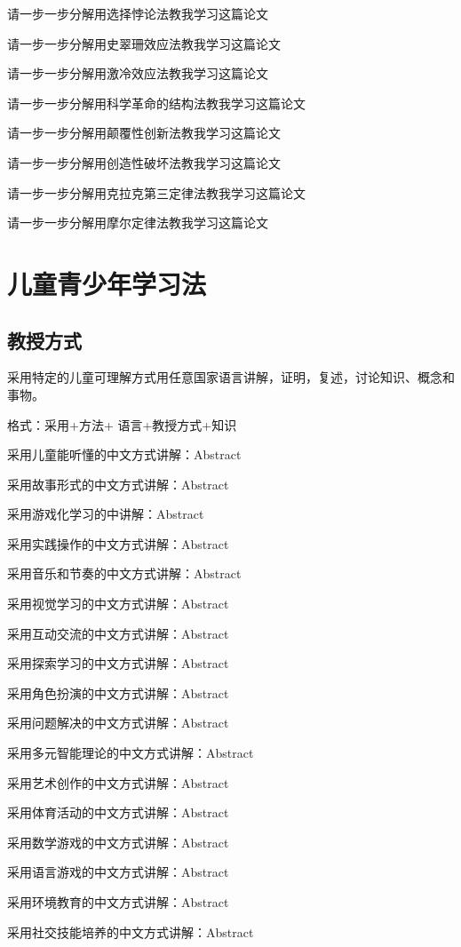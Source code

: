 \documentclass[12pt]{book}
\begin{document}
请一步一步分解用选择悖论法教我学习这篇论文

请一步一步分解用史翠珊效应法教我学习这篇论文


请一步一步分解用激冷效应法教我学习这篇论文

请一步一步分解用科学革命的结构法教我学习这篇论文

请一步一步分解用颠覆性创新法教我学习这篇论文


请一步一步分解用创造性破坏法教我学习这篇论文


请一步一步分解用克拉克第三定律法教我学习这篇论文

请一步一步分解用摩尔定律法教我学习这篇论文


\chapter{儿童青少年学习法}
\section{教授方式}
采用特定的儿童可理解方式用任意国家语言讲解，证明，复述，讨论知识、概念和事物。

格式：采用+方法+ 语言+教授方式+知识


采用儿童能听懂的中文方式讲解：Abstract

采用故事形式的中文方式讲解：Abstract

采用游戏化学习的中讲解：Abstract


采用实践操作的中文方式讲解：Abstract

采用音乐和节奏的中文方式讲解：Abstract

采用视觉学习的中文方式讲解：Abstract

采用互动交流的中文方式讲解：Abstract


采用探索学习的中文方式讲解：Abstract


采用角色扮演的中文方式讲解：Abstract


采用问题解决的中文方式讲解：Abstract


采用多元智能理论的中文方式讲解：Abstract


采用艺术创作的中文方式讲解：Abstract


采用体育活动的中文方式讲解：Abstract


采用数学游戏的中文方式讲解：Abstract


采用语言游戏的中文方式讲解：Abstract


采用环境教育的中文方式讲解：Abstract

采用社交技能培养的中文方式讲解：Abstract
\end{document}
